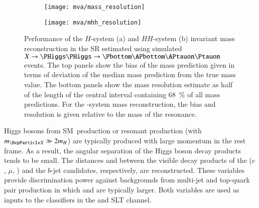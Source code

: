 


\begin{figure}[htbp]
  \centering

  \begin{subfigure}[t]{.5\textwidth}
    \centering
    \texttt{[image: mva/mass\_resolution]}
    \label{fig:mass_reconstruction_H}
  \end{subfigure}\hfill%
  \begin{subfigure}[t]{.5\textwidth}
    \centering
    \texttt{[image: mva/mhh\_resolution]}
    \label{fig:mass_reconstruction_HH}
  \end{subfigure}

  \caption[Performance of the $H$-system and $HH$-system invariant mass
  reconstruction in the \hadhad SR.]{Performance of the $H$-system (a) and
    $HH$-system (b) invariant mass reconstruction in the \hadhad SR estimated
    using simulated $X \to \HH \to \bbtautau$ events.  The top panels show the
    bias of the mass prediction given in terms of deviation of the median mass
    prediction from the true mass value. The bottom panels show the mass
    resolution estimate as half of the length of the central interval containing
    \SI{68}{\percent} of all mass predictions. For the \HH-system mass
    reconstruction, the bias and resolution is given relative to the mass of the
    resonance.}%
  \label{fig:mass_reconstruction}
\end{figure}

Higgs bosons from SM~\HH production or resonant \HH production (with
$\mX \gg 2\mH$) are typically produced with large momentum in the \HH rest
frame. As a result, the angular separation of the Higgs boson decay products
tends to be small. The distances \dRtautau and \dRbb between the visible decay
products of the \tauleptons ($e$, $\mu$, \tauhadvis) and the $b$-jet candidates,
respectively, are reconstructed. These variables provide discrimination power
against backgrounds from multi-jet and top-quark pair production in which
\dRtautau and \dRbb are typically larger. Both variables are used as inputs to
the classifiers in the \hadhad and \lephad SLT channel.

